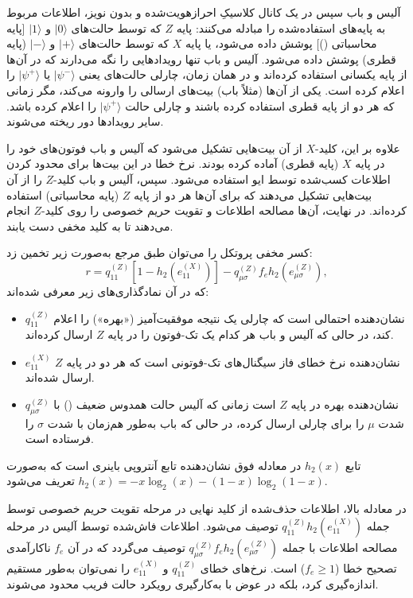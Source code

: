 آلیس و باب سپس در یک کانال کلاسیکِ احرازهویت‌شده و بدون نویز، اطلاعات مربوط به پایه‌های استفاده‌شده را مبادله می‌کنند: پایه $Z$ که توسط حالت‌های $|0\rangle$ و $|1\rangle$ [پایه محاسباتی ()] پوشش داده می‌شود، یا پایه $X$ که توسط حالت‌های $|+\rangle$ و $|-\rangle$ (پایه قطری) پوشش داده می‌شود. آلیس و باب تنها رویدادهایی را نگه می‌دارند که در آن‌ها از پایه یکسانی استفاده کرده‌اند و در همان زمان، چارلی حالت‌های  یعنی $|\psi^-\rangle$ یا $|\psi^+\rangle$ را اعلام کرده است. یکی از آن‌ها (مثلاً باب) بیت‌های ارسالی را وارونه می‌کند، مگر زمانی که هر دو از پایه قطری استفاده کرده باشند و چارلی حالت $|\psi^+\rangle$ را اعلام کرده باشد. سایر رویدادها دور ریخته می‌شوند.

علاوه بر این، کلید-$X$ از آن بیت‌هایی تشکیل می‌شود که آلیس و باب فوتون‌های خود را در پایه $X$ (پایه قطری) آماده کرده بودند. نرخ خطا در این بیت‌ها برای محدود کردن اطلاعات کسب‌شده توسط ایو استفاده می‌شود. سپس، آلیس و باب کلید-$Z$ را از آن بیت‌هایی تشکیل می‌دهند که برای آن‌ها هر دو از پایه $Z$ (پایه محاسباتی) استفاده کرده‌اند. در نهایت، آن‌ها مصالحه اطلاعات و تقویت حریم خصوصی را روی کلید-$Z$ انجام می‌دهند تا به کلید مخفی دست یابند.

کسر مخفی پروتکل  را می‌توان طبق مرجع \cite{7-112} به‌صورت زیر تخمین زد:
\begin{equation}
	r = q_{11}^{(Z)} [1 - h_2(e_{11}^{(X)})] - q_{\mu\sigma}^{(Z)} f_e h_2(e_{\mu\sigma}^{(Z)}),
	\label{eq:7-146}
\end{equation}
که در آن نمادگذاری‌های زیر معرفی شده‌اند:
\begin{itemize}
	\item $q_{11}^{(Z)}$ نشان‌دهنده احتمالی است که چارلی یک نتیجه موفقیت‌آمیز («بهره») را اعلام کند، در حالی که آلیس و باب هر کدام یک تک-فوتون را در پایه $Z$ ارسال کرده‌اند.
	\item $e_{11}^{(X)}$ نشان‌دهنده نرخ خطای فاز سیگنال‌های تک-فوتونی است که هر دو در پایه $Z$ ارسال شده‌اند.
	\item $q_{\mu\sigma}^{(Z)}$ نشان‌دهنده بهره در پایه $Z$ است زمانی که آلیس حالت همدوس ضعیف () با شدت $\mu$ را برای چارلی ارسال کرده، در حالی که باب به‌طور هم‌زمان  با شدت $\sigma$ را فرستاده است.
\end{itemize}
تابع $h_2(x)$ در معادله فوق نشان‌دهنده تابع آنتروپی باینری است که به‌صورت $h_2(x) = -x \log_2(x) - (1-x) \log_2(1-x)$ تعریف می‌شود.

در معادله بالا، اطلاعات حذف‌شده از کلید نهایی در مرحله تقویت حریم خصوصی توسط جمله $q_{11}^{(Z)} h_2(e_{11}^{(X)})$ توصیف می‌شود. اطلاعات فاش‌شده توسط آلیس در مرحله مصالحه اطلاعات با جمله $q_{\mu\sigma}^{(Z)} f_e h_2(e_{\mu\sigma}^{(Z)})$ توصیف می‌گردد که در آن $f_e$ ناکارآمدی تصحیح خطا ($f_e \geq 1$) است. نرخ‌های خطای $q_{11}^{(Z)}$ و $e_{11}^{(X)}$ را نمی‌توان به‌طور مستقیم اندازه‌گیری کرد، بلکه در عوض با به‌کارگیری رویکرد حالت فریب محدود می‌شوند.

